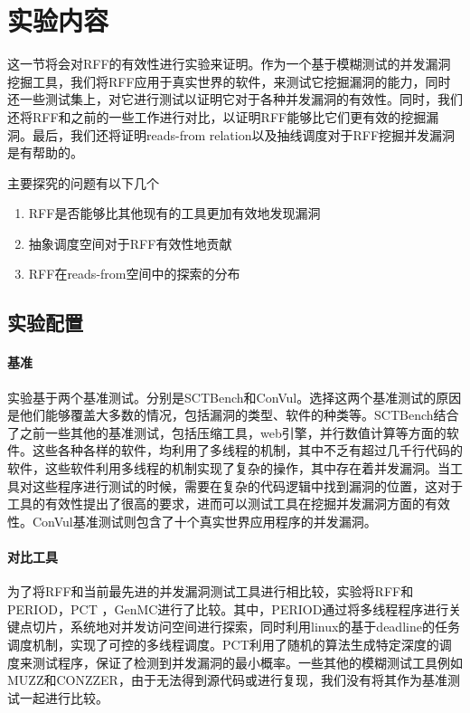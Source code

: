\section{实验内容}

这一节将会对RFF的有效性进行实验来证明。作为一个基于模糊测试的并发漏洞挖掘工具，我们将RFF应用于真实世界的软件，来测试它挖掘漏洞的能力，同时还一些测试集上，对它进行测试以证明它对于各种并发漏洞的有效性。同时，我们还将RFF和之前的一些工作进行对比，以证明RFF能够比它们更有效的挖掘漏洞。最后，我们还将证明reads-from relation以及抽线调度对于RFF挖掘并发漏洞是有帮助的。

主要探究的问题有以下几个

\begin{enumerate}
\item RFF是否能够比其他现有的工具更加有效地发现漏洞
\item 抽象调度空间对于RFF有效性地贡献
\item RFF在reads-from空间中的探索的分布
\end{enumerate}

\subsection{实验配置}

\paragraph{基准}实验基于两个基准测试。分别是SCTBench和ConVul。选择这两个基准测试的原因是他们能够覆盖大多数的情况，包括漏洞的类型、软件的种类等。SCTBench结合了之前一些其他的基准测试，包括压缩工具，web引擎，并行数值计算等方面的软件。这些各种各样的软件，均利用了多线程的机制，其中不乏有超过几千行代码的软件，这些软件利用多线程的机制实现了复杂的操作，其中存在着并发漏洞。当工具对这些程序进行测试的时候，需要在复杂的代码逻辑中找到漏洞的位置，这对于工具的有效性提出了很高的要求，进而可以测试工具在挖掘并发漏洞方面的有效性。ConVul基准测试则包含了十个真实世界应用程序的并发漏洞。

\paragraph{对比工具}为了将RFF和当前最先进的并发漏洞测试工具进行相比较，实验将RFF和PERIOD，PCT ，GenMC进行了比较。其中，PERIOD通过将多线程程序进行关键点切片，系统地对并发访问空间进行探索，同时利用linux的基于deadline的任务调度机制，实现了可控的多线程调度。PCT利用了随机的算法生成特定深度的调度来测试程序，保证了检测到并发漏洞的最小概率。一些其他的模糊测试工具例如MUZZ和CONZZER，由于无法得到源代码或进行复现，我们没有将其作为基准测试一起进行比较。

